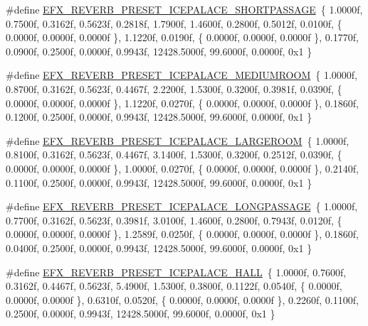 \begin{DoxyCompactItemize}
\item 
\#define \mbox{\hyperlink{efx-presets_8h_afccf8f45a932907098c4847c336a97f5}{E\+F\+X\+\_\+\+R\+E\+V\+E\+R\+B\+\_\+\+P\+R\+E\+S\+E\+T\+\_\+\+I\+C\+E\+P\+A\+L\+A\+C\+E\+\_\+\+S\+H\+O\+R\+T\+P\+A\+S\+S\+A\+GE}}~\{ 1.\+0000f, 0.\+7500f, 0.\+3162f, 0.\+5623f, 0.\+2818f, 1.\+7900f, 1.\+4600f, 0.\+2800f, 0.\+5012f, 0.\+0100f, \{ 0.\+0000f, 0.\+0000f, 0.\+0000f \}, 1.\+1220f, 0.\+0190f, \{ 0.\+0000f, 0.\+0000f, 0.\+0000f \}, 0.\+1770f, 0.\+0900f, 0.\+2500f, 0.\+0000f, 0.\+9943f, 12428.\+5000f, 99.\+6000f, 0.\+0000f, 0x1 \}
\item 
\#define \mbox{\hyperlink{efx-presets_8h_adcfa8da52e8876bda4b3598de6434f01}{E\+F\+X\+\_\+\+R\+E\+V\+E\+R\+B\+\_\+\+P\+R\+E\+S\+E\+T\+\_\+\+I\+C\+E\+P\+A\+L\+A\+C\+E\+\_\+\+M\+E\+D\+I\+U\+M\+R\+O\+OM}}~\{ 1.\+0000f, 0.\+8700f, 0.\+3162f, 0.\+5623f, 0.\+4467f, 2.\+2200f, 1.\+5300f, 0.\+3200f, 0.\+3981f, 0.\+0390f, \{ 0.\+0000f, 0.\+0000f, 0.\+0000f \}, 1.\+1220f, 0.\+0270f, \{ 0.\+0000f, 0.\+0000f, 0.\+0000f \}, 0.\+1860f, 0.\+1200f, 0.\+2500f, 0.\+0000f, 0.\+9943f, 12428.\+5000f, 99.\+6000f, 0.\+0000f, 0x1 \}
\item 
\#define \mbox{\hyperlink{efx-presets_8h_a0d680e53a7ff44ba5ec86768e065f2d0}{E\+F\+X\+\_\+\+R\+E\+V\+E\+R\+B\+\_\+\+P\+R\+E\+S\+E\+T\+\_\+\+I\+C\+E\+P\+A\+L\+A\+C\+E\+\_\+\+L\+A\+R\+G\+E\+R\+O\+OM}}~\{ 1.\+0000f, 0.\+8100f, 0.\+3162f, 0.\+5623f, 0.\+4467f, 3.\+1400f, 1.\+5300f, 0.\+3200f, 0.\+2512f, 0.\+0390f, \{ 0.\+0000f, 0.\+0000f, 0.\+0000f \}, 1.\+0000f, 0.\+0270f, \{ 0.\+0000f, 0.\+0000f, 0.\+0000f \}, 0.\+2140f, 0.\+1100f, 0.\+2500f, 0.\+0000f, 0.\+9943f, 12428.\+5000f, 99.\+6000f, 0.\+0000f, 0x1 \}
\item 
\#define \mbox{\hyperlink{efx-presets_8h_aeea083a21bc57d1d7ecc3563b6286209}{E\+F\+X\+\_\+\+R\+E\+V\+E\+R\+B\+\_\+\+P\+R\+E\+S\+E\+T\+\_\+\+I\+C\+E\+P\+A\+L\+A\+C\+E\+\_\+\+L\+O\+N\+G\+P\+A\+S\+S\+A\+GE}}~\{ 1.\+0000f, 0.\+7700f, 0.\+3162f, 0.\+5623f, 0.\+3981f, 3.\+0100f, 1.\+4600f, 0.\+2800f, 0.\+7943f, 0.\+0120f, \{ 0.\+0000f, 0.\+0000f, 0.\+0000f \}, 1.\+2589f, 0.\+0250f, \{ 0.\+0000f, 0.\+0000f, 0.\+0000f \}, 0.\+1860f, 0.\+0400f, 0.\+2500f, 0.\+0000f, 0.\+9943f, 12428.\+5000f, 99.\+6000f, 0.\+0000f, 0x1 \}
\item 
\#define \mbox{\hyperlink{efx-presets_8h_aa9cd072f8d0b155aba5a3fbeb11acfc4}{E\+F\+X\+\_\+\+R\+E\+V\+E\+R\+B\+\_\+\+P\+R\+E\+S\+E\+T\+\_\+\+I\+C\+E\+P\+A\+L\+A\+C\+E\+\_\+\+H\+A\+LL}}~\{ 1.\+0000f, 0.\+7600f, 0.\+3162f, 0.\+4467f, 0.\+5623f, 5.\+4900f, 1.\+5300f, 0.\+3800f, 0.\+1122f, 0.\+0540f, \{ 0.\+0000f, 0.\+0000f, 0.\+0000f \}, 0.\+6310f, 0.\+0520f, \{ 0.\+0000f, 0.\+0000f, 0.\+0000f \}, 0.\+2260f, 0.\+1100f, 0.\+2500f, 0.\+0000f, 0.\+9943f, 12428.\+5000f, 99.\+6000f, 0.\+0000f, 0x1 \}

\end{DoxyCompactItemize}

